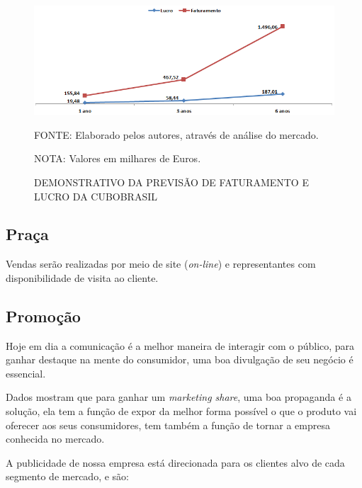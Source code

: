 \documentclass[
	12pt,				%
	openright,			%
	oneside,			%
	a4paper,			%
	english,			%
	french,				%
	spanish,			%
	brazil				%
	]{abntex2}
\begin{document}
	\begin{figure}[ht]
		\caption{DEMONSTRATIVO DA PREVISÃO DE FATURAMENTO E LUCRO DA CUBOBRASIL}
		\centering
		\includegraphics[width=1.0\linewidth]{./figs/Grafico_02}
		
		\begin{small}
			FONTE: Elaborado pelos autores, através de análise do mercado.
		\end{small}
		
		\begin{footnotesize}
			NOTA: Valores em milhares de Euros.
		\end{footnotesize}
	\end{figure}	
	
\subsection[Praça]{Praça}	

	Vendas serão realizadas por meio de site (\textit{on-line}) e representantes com disponibilidade de visita ao cliente.
	
\subsection[Promoção]{Promoção}
	
	Hoje em dia a comunicação é a melhor maneira de interagir com o público, para ganhar destaque na mente do consumidor, uma boa divulgação de seu negócio é essencial.
	
  	Dados mostram que para ganhar um \textit{marketing share}, uma boa propaganda é a solução, ela tem a função de expor da melhor forma possível o que o produto vai oferecer aos seus consumidores, tem também a função de tornar a empresa conhecida no mercado.
  	
	A publicidade de nossa empresa está direcionada para os clientes alvo de cada segmento de mercado, e são:
	
\end{document}
